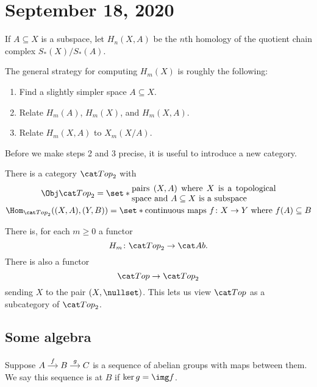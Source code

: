 \documentclass{standalone}
\begin{document}
\chapter{September 18, 2020}

\begin{definition}
  If \(A \subseteq X\) is a subspace, let \(H_n(X, A)\) be
  the \(n\)th homology of the quotient chain complex \(S_*(X)/S_*(A)\).
\end{definition}

The general strategy for computing \(H_m(X)\) is roughly the following:
\begin{enumerate}[nosep]
  \item Find a slightly simpler space \(A \subseteq X\).
  \item Relate \(H_m(A)\), \(H_m(X)\), and \(H_m(X, A)\).
  \item Relate \(H_m(X, A)\) to \(X_m(X/A)\).
\end{enumerate}

Before we make steps 2 and 3 precise, it is useful to introduce a new category.
\begin{definition}
  There is a category \(\cTop_2\) with
  \begin{gather*}
    \Obj \cTop_2 = \set*{\parbox{6cm}{%
      pairs \((X, A)\) where \(X\) is a topological space
      and \(A \subseteq X\) is a subspace
    }} \\
    \Hom_{\cTop_2}((X, A), (Y, B)) = \set*{\text{%
        continuous maps \(f \colon X \to Y\) where \(f(A) \subseteq B\)%
    }}
  \end{gather*}
\end{definition}

There is, for each \(m \geq 0\) a functor
\[
  H_m \colon \cTop_2 \to \cAb.
\]
There is also a functor
\[
  \cTop \to \cTop_2
\]
sending \(X\) to the pair \((X, \nullset)\). This lets us view \(\cTop\) as a
subcategory of \(\cTop_2\).

\section{Some algebra}
\begin{definition}
  Suppose
  \(
    \begin{tikzcd}[cramped, sep=small]
      A \ar[r, "f"] &
      B \ar[r, "g"] &
      C
    \end{tikzcd}
  \)
  is a sequence of abelian groups with maps between them. We say this sequence
  is  at \(B\) if \(\ker g = \img f\).
\end{definition}
\end{document}
